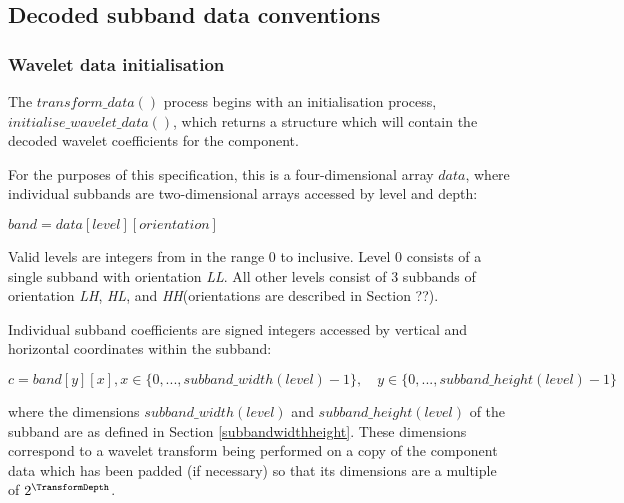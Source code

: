 

\newcommand{\LL}{\textit{LL}}
\newcommand{\LH}{\textit{LH}}
\newcommand{\HL}{\textit{HL}}
\newcommand{\HH}{\textit{HH}}

\label{transformdec}


\subsection{Decoded subband data conventions}
\label{wltdecodeconventions}

\subsubsection{Wavelet data initialisation}

\label{wltinit}

The $transform\_data()$ process begins with an initialisation process, 
$initialise\_wavelet\_data()$, which returns a structure which will
contain the decoded wavelet coefficients for the component. 

For the purposes of this specification, this is a four-dimensional array $data$,
where individual subbands are two-dimensional arrays accessed by level and depth:

$band = data[level][orientation]$

Valid levels are integers from in the range 0 to \TransformDepth inclusive. 
Level 0 consists of a single subband with orientation \LL. 
All other levels consist of 3 subbands of orientation \LH, \HL, 
and \HH (orientations are described in Section ??). 

Individual subband coefficients are signed integers accessed by vertical and 
horizontal coordinates within the subband:

$c = band[y][x], x\in\{0, ... , subband\_width(level)-1\},\quad 
y\in\{0, ... , subband\_height(level)-1\}$

where the dimensions $subband\_width(level)$ and $subband\_height(level)$ of the subband
are as defined in Section 
\ref{subbandwidthheight}. These dimensions correspond to a wavelet transform
being performed on a copy of the component data which has been padded (if necessary) so that its
dimensions are a multiple of $2^{\TransformDepth}$.


